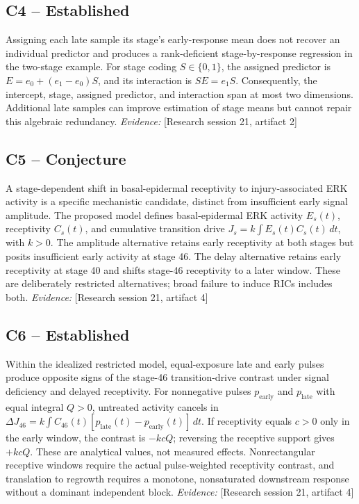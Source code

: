 \documentclass[11pt]{article}
\begin{document}
\subsection{C4 -- Established}
Assigning each late sample its stage's early-response mean does not recover an individual predictor and produces a rank-deficient stage-by-response regression in the two-stage example.
For stage coding $S\in\{0,1\}$, the assigned predictor is $E=e_0+(e_1-e_0)S$, and its interaction is $SE=e_1S$. Consequently, the intercept, stage, assigned predictor, and interaction span at most two dimensions. Additional late samples can improve estimation of stage means but cannot repair this algebraic redundancy.
\textit{Evidence: }[Research session 21, artifact 2]
\subsection{C5 -- Conjecture}
A stage-dependent shift in basal-epidermal receptivity to injury-associated ERK activity is a specific mechanistic candidate, distinct from insufficient early signal amplitude.
The proposed model defines basal-epidermal ERK activity $E_s(t)$, receptivity $C_s(t)$, and cumulative transition drive $J_s=k\int E_s(t)C_s(t)\,dt$, with $k>0$. The amplitude alternative retains early receptivity at both stages but posits insufficient early activity at stage 46. The delay alternative retains early receptivity at stage 40 and shifts stage-46 receptivity to a later window. These are deliberately restricted alternatives; broad failure to induce RICs includes both.
\textit{Evidence: }[Research session 21, artifact 4]
\subsection{C6 -- Established}
Within the idealized restricted model, equal-exposure late and early pulses produce opposite signs of the stage-46 transition-drive contrast under signal deficiency and delayed receptivity.
For nonnegative pulses $p_{\mathrm{early}}$ and $p_{\mathrm{late}}$ with equal integral $Q>0$, untreated activity cancels in $\Delta J_{46}=k\int C_{46}(t)[p_{\mathrm{late}}(t)-p_{\mathrm{early}}(t)]\,dt$. If receptivity equals $c>0$ only in the early window, the contrast is $-kcQ$; reversing the receptive support gives $+kcQ$. These are analytical values, not measured effects. Nonrectangular receptive windows require the actual pulse-weighted receptivity contrast, and translation to regrowth requires a monotone, nonsaturated downstream response without a dominant independent block.
\textit{Evidence: }[Research session 21, artifact 4]
\end{document}
